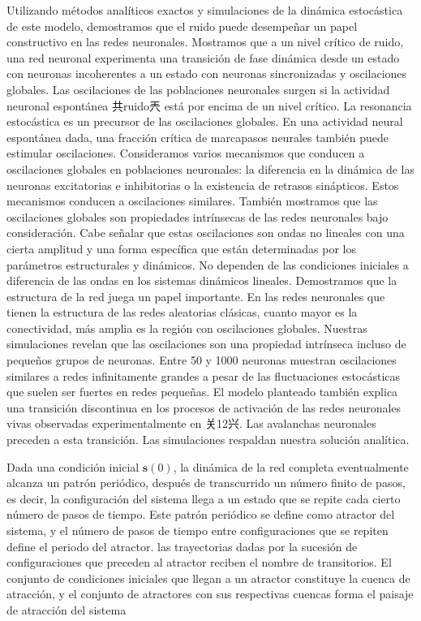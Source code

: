 Utilizando métodos analíticos exactos y simulaciones de la dinámica estocástica de este modelo, demostramos que el ruido puede desempeñar un papel constructivo en las redes neuronales. Mostramos que a un nivel crítico de ruido, una red neuronal experimenta una transición de fase dinámica desde un estado con neuronas incoherentes a un estado con neuronas sincronizadas y oscilaciones globales. Las oscilaciones de las poblaciones neuronales surgen si la actividad neuronal espontánea 共ruido兲 está por encima de un nivel crítico.
La resonancia estocástica es un precursor de las oscilaciones globales. En una actividad neural espontánea dada, una fracción crítica de marcapasos neurales también puede estimular oscilaciones. Consideramos varios mecanismos que conducen a oscilaciones globales en poblaciones neuronales: la diferencia en la dinámica de las neuronas excitatorias e inhibitorias o la existencia de retrasos sinápticos. Estos mecanismos conducen a oscilaciones similares. También mostramos que las oscilaciones globales son propiedades intrínsecas de las redes neuronales bajo consideración. Cabe señalar que estas oscilaciones son ondas no lineales con una cierta amplitud y una forma específica que están determinadas por los parámetros estructurales y dinámicos. No dependen de las condiciones iniciales a diferencia de las ondas en los sistemas dinámicos lineales. Demostramos que la estructura de la red juega un papel importante. En las redes neuronales que tienen la estructura de las redes aleatorias clásicas, cuanto mayor es la conectividad, más amplia es la región con oscilaciones globales. Nuestras simulaciones revelan que las oscilaciones son una propiedad intrínseca incluso de pequeños grupos de neuronas. Entre 50 y 1000 neuronas muestran oscilaciones similares a redes infinitamente grandes a pesar de las fluctuaciones estocásticas que suelen ser fuertes en redes pequeñas. El modelo planteado también explica una transición discontinua en los procesos de activación de las redes neuronales vivas observadas experimentalmente en 关12兴. Las avalanchas neuronales preceden a esta transición. Las simulaciones respaldan nuestra solución analítica.


Dada una condición inicial $\mathbf{s}(0)$, la dinámica de la red completa eventualmente alcanza un patrón periódico, después de transcurrido un número finito de pasos, es decir, la configuración del sistema llega a un estado que se repite cada cierto número de pasos de tiempo. Este patrón periódico se define como atractor del sistema, y el número de pasos de tiempo entre configuraciones que se repiten define el periodo del atractor. las trayectorias dadas por  la sucesión de configuraciones que preceden al atractor reciben el nombre de transitorios. El conjunto de condiciones iniciales que llegan a un atractor constituye la cuenca de atracción, y el conjunto de atractores con sus respectivas cuencas forma el paisaje de atracción del sistema



